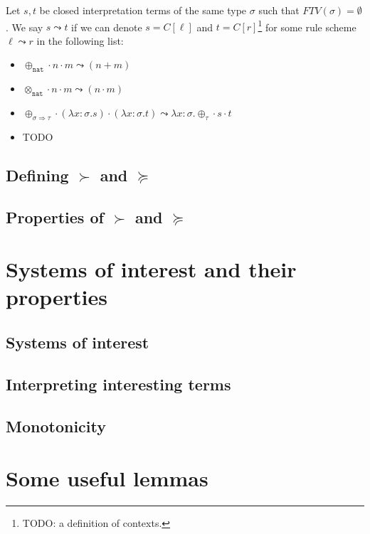 \documentclass[runningheads,a4paper]{llncs}
\newcommand{\arrtype}{\Rightarrow}
\newcommand{\abs}[2]{\lambda #1.#2}
\newcommand{\app}[2]{#1 \cdot #2}
\newcommand{\FTV}{\mathit{FTV}}
\newcommand{\nat}{\mathtt{nat}}
\begin{document}
\begin{definition}
Let $s,t$ be closed interpretation terms of the same type $\sigma$ such
that $\FTV(\sigma) = \emptyset$.  We say $s \leadsto t$ if we can denote
$s = C[\ell]$ and $t = C[r]$\footnote{TODO: a definition of contexts.}
for some rule scheme $\ell \leadsto r$ in the following list:
\begin{itemize}
\item $\app{\app{\oplus_{\nat}}{n}}{m} \leadsto (n+m)$ 
\item $\app{\app{\otimes_{\nat}}{n}}{m} \leadsto (n \cdot m)$ 
\item $\app{\app{\oplus_{\sigma \arrtype \tau}}{(\abs{x:\sigma}{s})}}{
  (\abs{x:\sigma}{t})} \leadsto \abs{x:\sigma}{\app{\app{\oplus_\tau}{
  s}}{t}}$
\item TODO
\end{itemize}
\end{definition}

\subsection{Defining $\succ$ and $\succeq$}

\subsection{Properties of $\succ$ and $\succeq$}

\section{Systems of interest and their properties}

\subsection{Systems of interest}

\subsection{Interpreting interesting terms}

\subsection{Monotonicity}

\section{Some useful lemmas}
\end{document}
